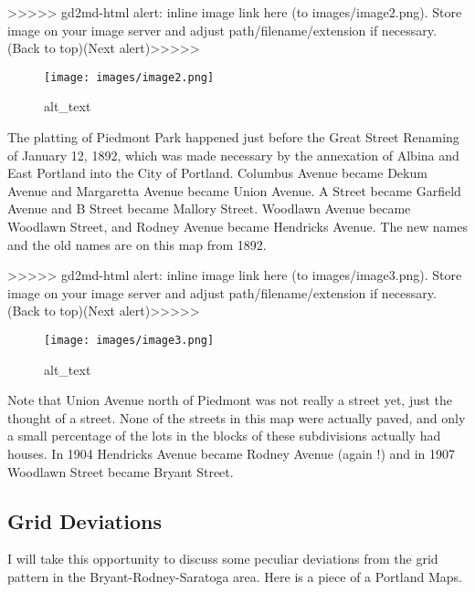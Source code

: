 \documentclass[
]{article}
\begin{document}
{\textgreater\textgreater\textgreater\textgreater\textgreater{}
gd2md-html alert: inline image link here (to images/image2.png). Store
image on your image server and adjust path/filename/extension if
necessary. }(Back to top)(Next
alert){\textgreater\textgreater\textgreater\textgreater\textgreater{} }

\begin{figure}
\centering
\texttt{[image: images/image2.png]}
\caption{alt\_text}
\end{figure}

The platting of Piedmont Park happened just before the Great Street
Renaming of January 12, 1892, which was made necessary by the annexation
of Albina and East Portland into the City of Portland. Columbus Avenue
became Dekum Avenue and Margaretta Avenue became Union Avenue. A Street
became Garfield Avenue and B Street became Mallory Street. Woodlawn
Avenue became Woodlawn Street, and Rodney Avenue became Hendricks
Avenue. The new names and the old names are on this map from 1892.

{\textgreater\textgreater\textgreater\textgreater\textgreater{}
gd2md-html alert: inline image link here (to images/image3.png). Store
image on your image server and adjust path/filename/extension if
necessary. }(Back to top)(Next
alert){\textgreater\textgreater\textgreater\textgreater\textgreater{} }

\begin{figure}
\centering
\texttt{[image: images/image3.png]}
\caption{alt\_text}
\end{figure}

Note that Union Avenue north of Piedmont was not really a street yet,
just the thought of a street. None of the streets in this map were
actually paved, and only a small percentage of the lots in the blocks of
these subdivisions actually had houses. In 1904 Hendricks Avenue became
Rodney Avenue (again !) and in 1907 Woodlawn Street became Bryant
Street.

\hypertarget{section-2}{%
\subsection{}\label{section-2}}

\hypertarget{grid-deviations}{%
\subsection{Grid Deviations}\label{grid-deviations}}

I will take this opportunity to discuss some peculiar deviations from
the grid pattern in the Bryant-Rodney-Saratoga area. Here is a piece of
a Portland Maps.
\end{document}
